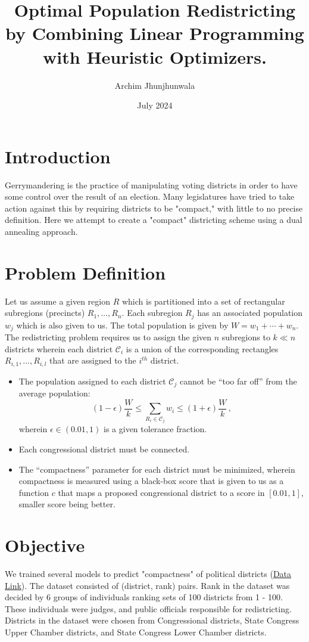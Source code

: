 \documentclass{article}
\title{Optimal Population Redistricting by Combining Linear Programming with Heuristic Optimizers.}
\author{Archim Jhunjhunwala}
\date{July 2024}
\begin{document}
\newcommand\scr[1]{\mathcal{#1}}

\maketitle

\section{Introduction}
Gerrymandering is the practice of manipulating voting districts in order to have some control over the result of an election. Many legislatures have tried to take action against this by requiring districts to be "compact," with little to no precise definition. Here we attempt to create a "compact" districting scheme using a dual annealing approach.


\section{Problem Definition}

Let us assume a given region $R$ which is partitioned into a set of rectangular subregions (precincts) $R_1, \ldots, R_n$. Each subregion $R_j$ has an associated population $w_j$ which is also given to us. The total population is given by $W = w_1 + \cdots + w_n$. The redistricting problem requires us to assign the given $n$ subregions to $k \ll n$ districts wherein each district $\scr{C}_i$ is a union of the corresponding rectangles $R_{i,1}, \ldots, R_{i,l}$ that are assigned to the $i^{th}$ district.
\begin{itemize}
\item The population assigned to each district $\scr{C}_j$ cannot be ``too far off'' from the average population: 
\[  (1 - \epsilon) \frac{W}{k} \leq \sum_{R_i \in \scr{C}_j} w_i \leq (1 + \epsilon) \frac{W}{k}  \,,\]
wherein $\epsilon \in (0.01, 1)$ is a given tolerance fraction.
\item Each congressional district must be connected.
\item The ``compactness'' parameter for each district must be minimized, wherein compactness is measured using a black-box score that is given to us as a function $c$ that maps a proposed congressional district to a score in $[0.01, 1]$, smaller score being better.
\end{itemize}

\section{Objective}
We trained several models to predict "compactness" of political districts (\href{https://github.com/aaronrkaufman/compactness}{Data Link}). The dataset consisted of (district, rank) pairs. Rank in the dataset was decided by 6 groups of individuals ranking sets of 100 districts from 1 - 100. These individuals were judges, and public officials responsible for redistricting. Districts in the dataset were chosen from Congressional districts, State Congress Upper Chamber districts, and State Congress Lower Chamber districts.
\end{document}
